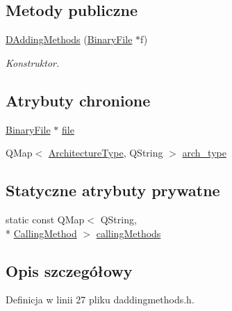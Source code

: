 \subsection*{Metody publiczne}
\begin{DoxyCompactItemize}
\item 
\hyperlink{class_d_adding_methods_aa00f1f94760a223807193314537b6651}{D\-Adding\-Methods} (\hyperlink{class_binary_file}{Binary\-File} $\ast$f)
\begin{DoxyCompactList}\small\item\em Konstruktor. \end{DoxyCompactList}\end{DoxyCompactItemize}
\subsection*{Atrybuty chronione}
\begin{DoxyCompactItemize}
\item 
\hyperlink{class_binary_file}{Binary\-File} $\ast$ \hyperlink{class_d_adding_methods_a87bdff1dd02ac26df6c10648fe406cd9}{file}
\item 
Q\-Map$<$ \hyperlink{class_d_adding_methods_a7d062c443c04f37689dbececc36cf4a3}{Architecture\-Type}, Q\-String $>$ \hyperlink{class_d_adding_methods_aa368755d8aba57f3a92877d1fbe925b3}{arch\-\_\-type}
\end{DoxyCompactItemize}
\subsection*{Statyczne atrybuty prywatne}
\begin{DoxyCompactItemize}
\item 
static const Q\-Map$<$ Q\-String, \\*
\hyperlink{class_d_adding_methods_a8b52c07f1794d8c6cdd6f9b98be2bbf0}{Calling\-Method} $>$ \hyperlink{class_d_adding_methods_a4c746112dd790909f893063563cd7877}{calling\-Methods}
\end{DoxyCompactItemize}


\subsection{Opis szczegółowy}


Definicja w linii 27 pliku daddingmethods.\-h.



